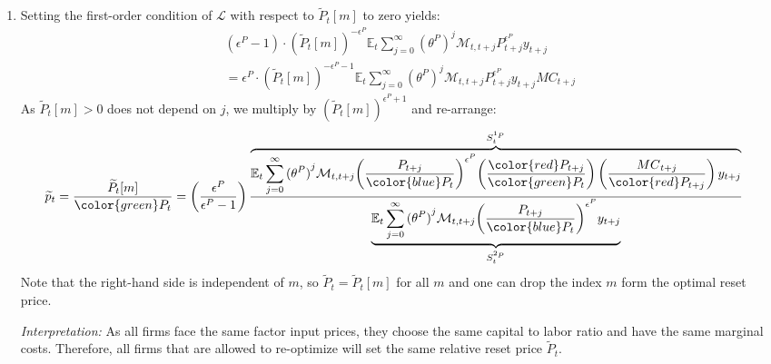 \begin{enumerate}
\item
Setting the first-order condition of \(\mathcal{L}\) with respect to \(\widetilde{P}_{t}[m]\) to zero yields:
\begin{multline*}
(\epsilon^{P}-1) \cdot {(\widetilde{P}_{t}[m])}^{-\epsilon^{P}}
\mathbb{E}_{t} \sum_{j=0}^{\infty} {(\theta^{P})}^{j} \mathcal{M}_{t,t+j} P_{t+j}^{\epsilon^{P}} y_{t+j}
\\
=
\epsilon^{P} \cdot {(\widetilde{P}_{t}[m])}^{-\epsilon^{P}-1}
\mathbb{E}_{t} \sum_{j=0}^{\infty} {(\theta^{P})}^{j} \mathcal{M}_{t,t+j} P_{t+j}^{\epsilon^{P}} y_{t+j} {MC}_{t+j}
\end{multline*}
As \(\widetilde{P}_{t}[m]>0\) does not depend on \(j\), we multiply by \({(\widetilde{P}_t[m])}^{\epsilon^{P}+1}\) and re-arrange:
\begin{align*}
\widetilde{p}_{t}= \frac{\widetilde{P}_{t}[m]}{{\color{green}P_{t}}}
&= \left(\frac{\epsilon^{P}}{\epsilon^{P}-1}\right)
\frac{\overbrace{%
  \mathbb{E}_{t} \sum_{j=0}^{\infty} {(\theta^{P})}^{j} \mathcal{M}_{t,t+j} {\left(\frac{P_{t+j}}{{\color{blue} P_{t}}}\right)}^{\epsilon^{P}} {\left(\frac{{\color{red}P_{t+j}}}{{\color{green} P_{t}}}\right)} \left(\frac{{MC}_{t+j}}{{\color{red}P_{t+j}}}\right) y_{t+j} 
}^{S^{1_{P}}_{t}}
}
{\underbrace{%
  \mathbb{E}_{t} \sum_{j=0}^{\infty} {(\theta^{P})}^{j} \mathcal{M}_{t,t+j} {\left(\frac{P_{t+j}}{{\color{blue} P_{t}}}\right)}^{\epsilon^{P}} y_{t+j}
}_{S^{2_{P}}_{t}}
}
\end{align*}
Note that the right-hand side is independent of \(m\),
  so \(\widetilde{P}_{t} = \widetilde{P}_{t}[m]\) for all \(m\)
  and one can drop the index \(m\) form the optimal reset price.

\emph{Interpretation:} As all firms face the same factor input prices, they choose the same capital to labor ratio and have the same marginal costs.
Therefore, all firms that are allowed to re-optimize will set the same relative reset price \(\widetilde{P}_{t}\).


\end{enumerate}
